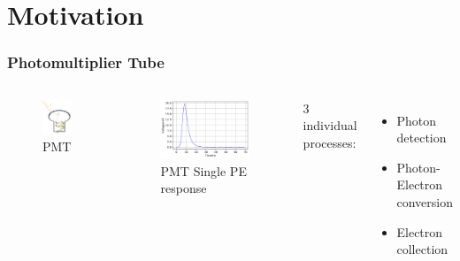\documentclass[handout]{beamer}
\begin{document}
\section{Motivation}
\begin{frame}
\frametitle{Photomultiplier Tube}
\setlength{\abovecaptionskip}{0mm}
\setlength{\belowcaptionskip}{0mm}
\begin{columns}
\begin{figure}
    \centering
    \caption{PMT}
    \includegraphics[width=0.3\linewidth]{img/PMT.png}
\end{figure}
\begin{figure}
    \centering
    \caption{PMT Single PE response}
    \includegraphics[width=0.9\linewidth]{img/pmtspe.png}
\end{figure}
\begin{center}
    3 individual processes:
\end{center}
\begin{itemize}
    \item Photon detection
    \item Photon-Electron conversion
    \item Electron collection
\end{itemize}
\end{columns}
\end{frame}
\end{document}
